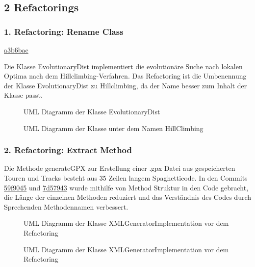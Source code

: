 \subsection{2 Refactorings}

\subsubsection{1. Refactoring: Rename Class}

\href{https://github.com/reichert-p/GPXrechner/commit/7947597903210e73647ffbc20d07e6b5b257cff2\#diff-a3b6bacc77a02d2a1746cbbbd776a467bf3fcd7920bfefbef1e892af10172e50 }{a3b6bac}

Die Klasse EvolutionaryDist implementiert die evolutionäre Suche nach lokalen Optima nach dem Hillclimbing-Verfahren.
Das Refactoring ist die Umbenennung der Klasse EvolutionaryDist zu Hillclimbing, da der Name besser zum Inhalt der Klasse passt.

\begin{figure}[H]
  \centering
  
  \caption{UML Diagramm der Klasse EvolutionaryDist}
\end{figure}

\begin{figure}[H]
  \centering
  
  \caption{UML Diagramm der Klasse unter dem Namen HillClimbing}
\end{figure}

\subsubsection{2. Refactoring: Extract Method}

Die Methode generateGPX zur Erstellung einer .gpx Datei aus gespeicherten Touren und Tracks besteht aus 35 Zeilen langem Spaghetticode. 
In den Commits 
\href{https://github.com/reichert-p/GPXrechner/commit/59f9045a2ac73496111bba87c35016c2b26108e2}{59f9045}
und 
\href{https://github.com/reichert-p/GPXrechner/commit/7d57943bb5fcdf2d23e76f05c0157f7753f6c05e}{7d57943} 
wurde mithilfe von Method Struktur in den Code gebracht, die Länge der einzelnen Methoden reduziert und das Verständnis des Codes durch Sprechenden Methodennamen verbessert.

\begin{figure}[H]
  \centering
  
  \caption{UML Diagramm der Klasse XMLGeneratorImplementation vor dem Refactoring}
\end{figure}

\begin{figure}[H]
  \centering
  
  \caption{UML Diagramm der Klasse XMLGeneratorImplementation vor dem Refactoring}
\end{figure}